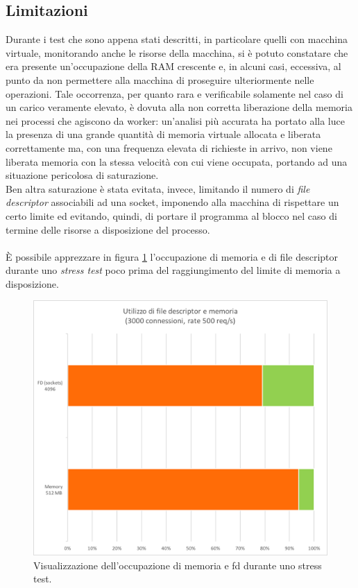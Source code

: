 \documentclass[italian]{tktltiki2}
\begin{document}
\subsection{Limitazioni}
Durante i test che sono appena stati descritti, in particolare quelli con macchina virtuale, monitorando anche le risorse della macchina, si è potuto constatare che era presente un'occupazione della RAM crescente e, in alcuni casi, eccessiva, al punto da non permettere alla macchina di proseguire ulteriormente nelle operazioni. Tale occorrenza, per quanto rara e verificabile solamente nel caso di un carico veramente elevato, è dovuta alla non corretta liberazione della memoria nei processi che agiscono da worker: un'analisi più accurata ha portato alla luce la presenza di una grande quantità di memoria virtuale allocata e liberata correttamente ma, con una frequenza elevata di richieste in arrivo, non viene liberata memoria con la stessa velocità con cui viene occupata, portando ad una situazione pericolosa di saturazione. \\
Ben altra saturazione è stata evitata, invece, limitando il numero di \emph{file descriptor} associabili ad una socket, imponendo alla macchina di rispettare un certo limite ed evitando, quindi, di portare il programma al blocco nel caso di termine delle risorse a disposizione del processo. \\\\
È possibile apprezzare in figura \ref{fig: fd_memory} l'occupazione di memoria e di file descriptor durante uno \emph{stress test} poco prima del raggiungimento del limite di memoria a disposizione. 
\begin{figure}[H]
\centering
\includegraphics[width=\textwidth]{images/fd_memory}
\caption{Visualizzazione dell'occupazione di memoria e fd durante uno stress test.\label{fig: fd_memory}}
\end{figure}
\end{document}
